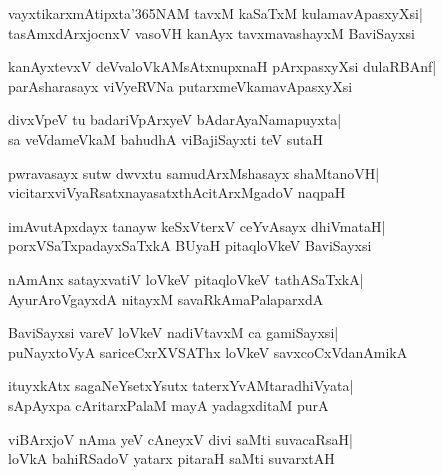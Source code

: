 \documentclass[twoside,12pt,openright]{book}
\newcounter{shloka}[chapter]
\begin{document}
\begin{shloka}%
vayxtikarxmAtipxta\char'365NAM tavxM kaSaTxM kulamavApasxyXsi|\\
tasAmxdArxjocnxV vasoVH kanAyx tavxmavashayxM BaviSayxsi
\end{shloka}

\begin{shloka}%
kanAyxtevxV deVvaloVkAMsAtxnupxnaH pArxpasxyXsi dulaRBAnf|\\
parAsharasayx viVyeRVNa putarxmeVkamavApasxyXsi
\end{shloka}

\begin{shloka}%
divxVpeV tu badariVpArxyeV bAdarAyaNamapuyxta|\\
sa veVdameVkaM bahudhA viBajiSayxti teV sutaH
\end{shloka}

\begin{shloka}%
pwravasayx sutw dwvxtu samudArxMshasayx shaMtanoVH|\\
vicitarxviVyaRsatxnayasatxthAcitArxMgadoV naqpaH
\end{shloka}

\begin{shloka}%
imAvutApxdayx tanayw keSxVterxV ceYvAsayx dhiVmataH|\\
porxVSaTxpadayxSaTxkA BUyaH pitaqloVkeV BaviSayxsi
\end{shloka}

\begin{shloka}%
nAmAnx satayxvatiV loVkeV pitaqloVkeV tathASaTxkA|\\
AyurAroVgayxdA nitayxM savaRkAmaPalaparxdA
\end{shloka}

\begin{shloka}%
BaviSayxsi vareV loVkeV nadiVtavxM ca gamiSayxsi|\\
puNayxtoVyA sariceCxrXVSAThx loVkeV savxcoCxVdanAmikA
\end{shloka}

\begin{shloka}%
ituyxkAtx sagaNeYsetxYsutx taterxYvAMtaradhiVyata|\\
sApAyxpa cAritarxPalaM mayA yadagxditaM purA
\end{shloka}

\begin{shloka}%
viBArxjoV nAma yeV cAneyxV divi saMti suvacaRsaH|\\
loVkA bahiRSadoV yatarx pitaraH saMti suvarxtAH
\end{shloka}
\end{document}
